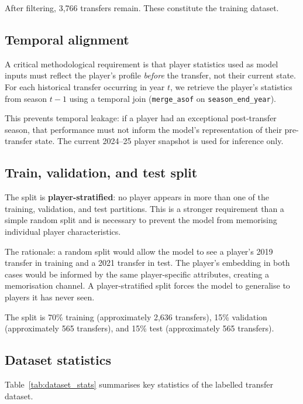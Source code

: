 \documentclass[12pt, a4paper, oneside]{report}
\begin{document}
After filtering, 3,766 transfers remain. These constitute the training dataset.

\subsection{Temporal alignment}

A critical methodological requirement is that player statistics used as model inputs must reflect the player's profile \textit{before} the transfer, not their current state. For each historical transfer occurring in year $t$, we retrieve the player's statistics from season $t-1$ using a temporal join (\texttt{merge\_asof} on \texttt{season\_end\_year}).

This prevents temporal leakage: if a player had an exceptional post-transfer season, that performance must not inform the model's representation of their pre-transfer state. The current 2024--25 player snapshot is used for inference only.

\subsection{Train, validation, and test split}

The split is \textbf{player-stratified}: no player appears in more than one of the training, validation, and test partitions. This is a stronger requirement than a simple random split and is necessary to prevent the model from memorising individual player characteristics.

The rationale: a random split would allow the model to see a player's 2019 transfer in training and a 2021 transfer in test. The player's embedding in both cases would be informed by the same player-specific attributes, creating a memorisation channel. A player-stratified split forces the model to generalise to players it has never seen.

The split is 70\% training (approximately 2,636 transfers), 15\% validation (approximately 565 transfers), and 15\% test (approximately 565 transfers).

\subsection{Dataset statistics}

Table~\ref{tab:dataset_stats} summarises key statistics of the labelled transfer dataset.
\end{document}
